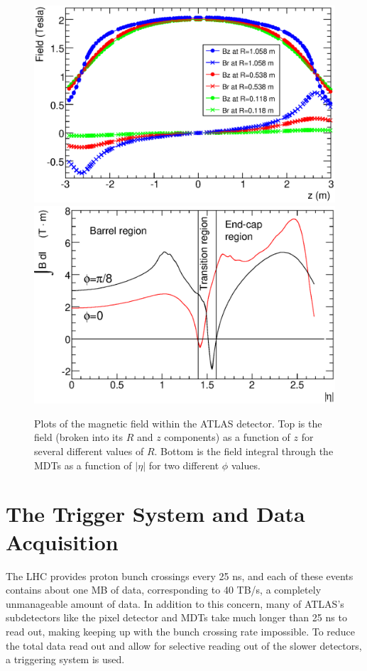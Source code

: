\begin{centering}
\begin{figure}[!htb]
\myfloatalign
\includegraphics[width=.90\linewidth]{figures/atlas/solMeasB.eps}
\includegraphics[width=.90\linewidth]{figures/atlas/IBdl.eps}
\caption{Plots of the magnetic field within the ATLAS detector. Top is the field (broken into its $R$ and $z$ components) as a function of $z$ for several different values of $R$. Bottom is the field integral through the \acp{MDT} as a function of $|\eta|$ for two different $\phi$ values. }
\label{fig:bfield}
\end{figure}
\end{centering}

\section{The Trigger System and Data Acquisition}
\label{sec:Trigger}

The \ac{LHC} provides proton bunch crossings every 25 ns, and each of these events contains about one MB of data, corresponding to 40 TB/s, a completely unmanageable amount of data. In addition to this concern, many of ATLAS's subdetectors like the pixel detector and \acp{MDT} take much longer than 25 ns to read out, making keeping up with the bunch crossing rate impossible. To reduce the total data read out and allow for selective reading out of the slower detectors, a triggering system is used. 

